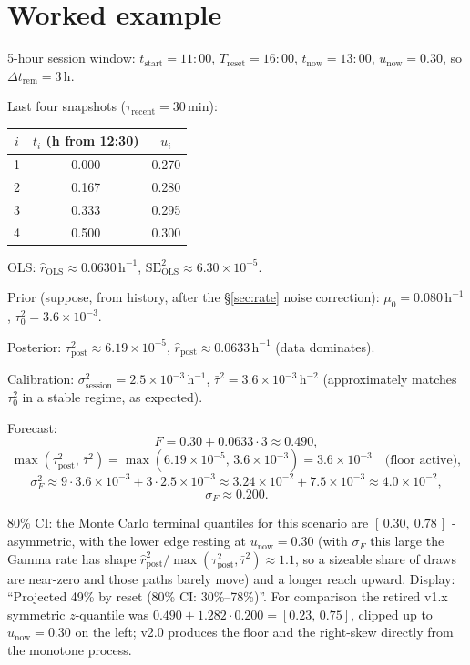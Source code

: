 \documentclass[11pt]{article}
\newcommand{\rpost}{\hat r_{\text{post}}}
\newcommand{\taupostsq}{\tau_{\text{post}}^2}
\newcommand{\tauzerosq}{\tau_0^2}
\newcommand{\rols}{\hat r_{\text{OLS}}}
\newcommand{\seolssq}{\mathrm{SE}_{\text{OLS}}^2}
\newcommand{\sigsessionsq}{\sigma_{\text{session}}^2}
\newcommand{\unow}{u_{\text{now}}}
\newcommand{\tnow}{t_{\text{now}}}
\newcommand{\Treset}{T_{\text{reset}}}
\newcommand{\Dtrem}{\Delta t_{\text{rem}}}
\newcommand{\taurecent}{\tau_{\text{recent}}}
\begin{document}
\section{Worked example}

5-hour session window: $t_{\text{start}} = 11{:}00$, $\Treset = 16{:}00$,
$\tnow = 13{:}00$, $\unow = 0.30$, so $\Dtrem = 3$\,h.

Last four snapshots ($\taurecent = 30$\,min):

\begin{center}
\begin{tabular}{@{}ccc@{}}
\toprule
$i$ & $t_i$ (h from 12{:}30) & $u_i$ \\
\midrule
1 & 0.000 & 0.270 \\
2 & 0.167 & 0.280 \\
3 & 0.333 & 0.295 \\
4 & 0.500 & 0.300 \\
\bottomrule
\end{tabular}
\end{center}

OLS: $\rols \approx 0.0630\,\mathrm{h}^{-1}$, $\seolssq \approx 6.30 \times
10^{-5}$.

Prior (suppose, from history, after the \S\ref{sec:rate} noise correction):
$\mu_0 = 0.080\,\mathrm{h}^{-1}$, $\tauzerosq = 3.6 \times 10^{-3}$.

Posterior: $\taupostsq \approx 6.19 \times 10^{-5}$, $\rpost \approx
0.0633\,\mathrm{h}^{-1}$ (data dominates).

Calibration: $\sigsessionsq = 2.5 \times 10^{-3}\,\mathrm{h}^{-1}$, $\bar\tau^2
= 3.6 \times 10^{-3}\,\mathrm{h}^{-2}$ (approximately matches $\tauzerosq$ in a
stable regime, as expected).

Forecast:
\[
  F = 0.30 + 0.0633 \cdot 3 \approx 0.490,
\]
\[
  \max(\taupostsq,\, \bar\tau^2) = \max(6.19 \times 10^{-5},\, 3.6 \times 10^{-3})
    = 3.6 \times 10^{-3} \quad \text{(floor active)},
\]
\[
  \sigma_F^2 \approx 9 \cdot 3.6 \times 10^{-3}
    + 3 \cdot 2.5 \times 10^{-3}
    \approx 3.24 \times 10^{-2} + 7.5 \times 10^{-3}
    \approx 4.0 \times 10^{-2},
\]
\[
  \sigma_F \approx 0.200.
\]

80\% CI: the Monte Carlo terminal quantiles for this scenario are
$[\,0.30,\ 0.78\,]$ - asymmetric, with the lower edge resting at $\unow =
0.30$ (with $\sigma_F$ this large the Gamma rate has shape
$\rpost^2/\max(\taupostsq,\bar\tau^2) \approx 1.1$, so a sizeable share of
draws are near-zero and those paths barely move) and a longer reach upward.
Display: ``Projected 49\% by reset (80\% CI: 30\%--78\%)''. For comparison the
retired v1.x symmetric $z$-quantile was $0.490 \pm 1.282 \cdot 0.200 = [0.23,\,
0.75]$, clipped up to $\unow = 0.30$ on the left; v2.0 produces the floor and
the right-skew directly from the monotone process.
\end{document}
